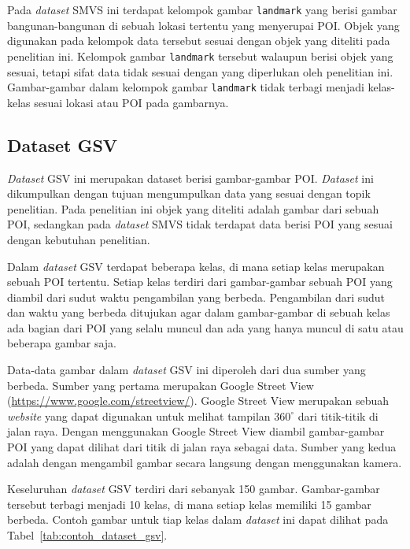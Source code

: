 Pada \textit{dataset} SMVS ini terdapat kelompok gambar \texttt{landmark} yang berisi gambar bangunan-bangunan di sebuah lokasi tertentu yang menyerupai POI. Objek yang digunakan pada kelompok data tersebut sesuai dengan objek yang diteliti pada penelitian ini. Kelompok gambar \texttt{landmark} tersebut walaupun berisi objek yang sesuai, tetapi sifat data tidak sesuai dengan yang diperlukan oleh penelitian ini. Gambar-gambar dalam kelompok gambar \texttt{landmark} tidak terbagi menjadi kelas-kelas sesuai lokasi atau POI pada gambarnya.

\subsection{Dataset GSV}
\label{subsec:dataset_gsv}
\textit{Dataset} GSV ini merupakan dataset berisi gambar-gambar POI. \textit{Dataset} ini dikumpulkan dengan tujuan mengumpulkan data yang sesuai dengan topik penelitian. Pada penelitian ini objek yang diteliti adalah gambar dari sebuah POI, sedangkan pada \textit{dataset} SMVS tidak terdapat data berisi POI yang sesuai dengan kebutuhan penelitian. 

Dalam \textit{dataset} GSV terdapat beberapa kelas, di mana setiap kelas merupakan sebuah POI tertentu. Setiap kelas terdiri dari gambar-gambar sebuah POI yang diambil dari sudut waktu pengambilan yang berbeda. Pengambilan dari sudut dan waktu yang berbeda ditujukan agar dalam gambar-gambar di sebuah kelas ada bagian dari POI yang selalu muncul dan ada yang hanya muncul di satu atau beberapa gambar saja. 

Data-data gambar dalam \textit{dataset} GSV ini diperoleh dari dua sumber yang berbeda. Sumber yang pertama merupakan Google Street View (\url{https://www.google.com/streetview/}). Google Street View merupakan sebuah \textit{website} yang dapat digunakan untuk melihat tampilan $360^{\circ}$ dari titik-titik di jalan raya. Dengan menggunakan Google Street View diambil gambar-gambar POI yang dapat dilihat dari titik di jalan raya sebagai data. Sumber yang kedua adalah dengan mengambil gambar secara langsung dengan menggunakan kamera. 

Keseluruhan \textit{dataset} GSV terdiri dari sebanyak 150 gambar. Gambar-gambar tersebut terbagi menjadi 10 kelas, di mana setiap kelas memiliki 15 gambar berbeda. Contoh gambar untuk tiap kelas dalam \textit{dataset} ini dapat dilihat pada Tabel~\ref{tab:contoh_dataset_gsv}.

